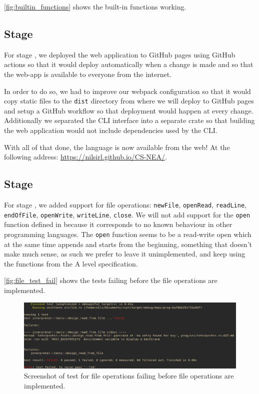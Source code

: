 \documentclass{article}
\newcommand{\subsecnum}{\the\value{subsection}}
\begin{document}
\autoref{fig:builtin_functions} shows the built-in functions working.

\subsection{Stage \subsecnum}

For stage \subsecnum, we deployed the web application to GitHub pages using GitHub
actions so that it would deploy automatically when a change is made and so that
the web-app is available to everyone from the internet.

In order to do so, we had to improve our webpack configuration so that it would
copy static files to the \texttt{dist} directory from where we will deploy to
GitHub pages and setup a GitHub workflow so that deployment would happen at
every change. Additionally we separated the CLI interface into a separate crate
so that building the web application would not include dependencies used by the
CLI.

With all of that done, the language is now available from the web! At the
following address: \url{https://nilsirl.github.io/CS-NEA/}.

\subsection{Stage \subsecnum}

For stage \subsecnum, we added support for file operations: \texttt{newFile},
\texttt{openRead}, \texttt{readLine}, \texttt{endOfFile}, \texttt{openWrite},
\texttt{writeLine}, \texttt{close}. We will not add support for the
\texttt{open} function defined in  because it corresponds to no
known behaviour in other programming languages. The \texttt{open} function
seems to be a read-write open which at the same time appends and starts from
the beginning, something that doesn't make much sense, as such we prefer to
leave it unimplemented, and keep using the functions from the A level
specification.

\autoref{fig:file_test_fail} shows the tests failing before the file operations
are implemented.

\begin{figure}
	\includegraphics[width=\textwidth]{file_test_fail}
	\caption{Screenshot of test for file operations failing before file
	operations are implemented.}
	\label{fig:file_test_fail}
\end{figure}
\end{document}
